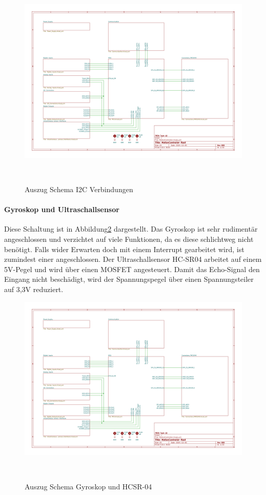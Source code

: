 \documentclass[main.  tex]{subfiles} %
\begin{document}
\begin{figure}[H]
    \centering
    \includegraphics[page=9,width=\textwidth]{../Anhang_pdfs/MotionController.pdf}
    \caption{Auszug Schema I2C Verbindungen}~\label{fig:Schema_I2C}
\end{figure}

\newpage

\paragraph{Gyroskop und Ultraschallsensor}
Diese Schaltung ist in Abbildung\ref{fig:Schema_sonstige_Sensoren} dargestellt.
Das Gyroskop ist sehr rudimentär angeschlossen und verzichtet auf viele
Funktionen, da es diese schlichtweg nicht benötigt. Falls wider Erwarten doch
mit einem Interrupt gearbeitet wird, ist zumindest einer angeschlossen. Der
Ultraschallsensor HC-SR04 arbeitet auf einem 5V-Pegel und wird über einen
MOSFET angesteuert. Damit das Echo-Signal den Eingang nicht beschädigt, wird
der Spannungspegel über einen Spannungsteiler auf 3,3V reduziert.

\begin{figure}[H]
    \centering
    \includegraphics[page=10,width=\textwidth]{../Anhang_pdfs/MotionController.pdf}
    \caption{Auszug Schema Gyroskop und HCSR-04}~\label{fig:Schema_sonstige_Sensoren}
\end{figure}
\end{document}

